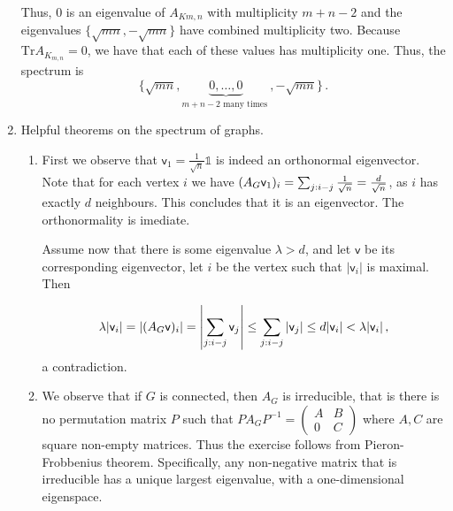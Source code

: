 \documentclass[kulak]{tplt}
\theoremstyle{definition}
\newcommand{\vv}{\mathsf{v}}
\newcommand{\Tr}{\mathrm{Tr}}
\begin{document}
\begin{enumerate}
Thus, $0$ is an eigenvalue of $A_{K{m, n}}$ with multiplicity $m+n-2$ and the eigenvalues $\{ \sqrt{mn}, -\sqrt{mn}\}$ have combined multiplicity two.
Because $\Tr A_{K_{m, n}} =0 $, we have that each of these values has multiplicity one.
Thus, the spectrum is 
$$ \{ \sqrt{mn}, \underbrace{0, \ldots, 0}_{m+n-2 \text{ many times }}, -\sqrt{mn} \} \, . $$

\item Helpful theorems on the spectrum of graphs.

\begin{enumerate}
\item 
First we observe that $\vv_1 = \frac{1}{\sqrt{n}} \mathbb{1}$ is indeed an orthonormal eigenvector.
Note that for each vertex $i$ we have $(A_G \vv_1)_i = \sum_{j : i\-- j} \frac{1}{\sqrt{n}} = \frac{d}{\sqrt{n}}$, as $i$ has exactly $d$ neighbours.
This concludes that it is an eigenvector.
The orthonormality is imediate.

Assume now that there is some eigenvalue $\lambda > d$, and let $\vv $ be its corresponding eigenvector, let $i$ be the vertex such that $|\vv_i|$ is maximal.
Then 

$$\lambda |\vv_i | = |(A_G \vv)_i| = \left|\sum_{j : i\-- j} \vv_j \right| \leq \sum_{j : i\-- j} |\vv_j| \leq d |\vv_i| < \lambda |\vv_i | \, ,$$
a contradiction.

\item 
We observe that if $G$ is connected, then $A_G$ is irreducible, that is there is no permutation matrix $P$ such that $PA_GP^{-1} = \begin{pmatrix}
A&B\\ 0 & C\end{pmatrix}$ where $A, C$ are square non-empty matrices.
Thus the exercise follows from Pieron-Frobbenius theorem.
Specifically, any non-negative matrix that is irreducible has a unique largest eigenvalue, with a one-dimensional eigenspace.


\end{enumerate}
\end{enumerate}
\end{document}
